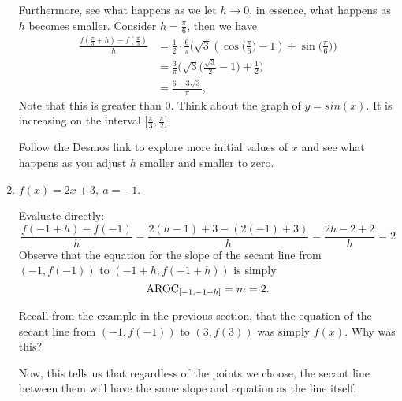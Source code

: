 \documentclass{ximera}
\begin{document}
\begin{example}
\begin{enumerate}[label=\alph*.]
\begin{explanation}
 Furthermore, see what happens as we let $h \rightarrow 0$, in essence, what happens as $h$ becomes smaller. Consider $h =\frac{\pi}{6}$, then we have 
  \begin{align*}
   \frac{f(\frac{\pi}{3} + h) - f(\frac{\pi}{3})}{h} &= \frac{1}{2} \cdot \frac{6}{\pi}\big(\sqrt{3}(\cos\Big(\frac{\pi}{6}\Big) -1) + \sin\Big(\frac{\pi}{6}\Big)\big)\\
   &= \frac{3}{\pi}\Big(\sqrt{3}\Big(\frac{\sqrt{3}}{2} -1\Big)+ \frac{1}{2}\Big)\\
   &=\frac{6-3\sqrt{3}}{\pi},
   \end{align*}
   Note that this is greater than 0. Think about the graph of $y=sin(x)$. It is increasing on the interval $\big[\frac{\pi}{3}, \frac{\pi}{2}\big]$.
   
   Follow the Desmos link to explore more initial values of $x$ and see what happens as you adjust $h$ smaller and smaller to zero.

    \end{explanation}
  
  \item $f(x) = 2x+3, \ a = -1$.\\
  \begin{explanation}
  Evaluate directly:
  \begin{equation*}
  \frac{f(-1 + h) - f(-1)}{h} = \frac{2(h-1) + 3 - (2(-1)+3)}{h} = \frac{2h-2 +2}{h} = 2 
  \end{equation*}
  Observe that the equation for the slope of the secant line from $(-1,f(-1))$ to $(-1+h,f(-1+h))$ is simply
  $$\mathrm{AROC}_{[-1,-1+h]}=  m = 2.$$
  
 Recall from the example in the previous section, that the equation of the secant line from $(-1,f(-1))$ to $(3,f(3))$ was simply $f(x)$. Why was this?
  
Now, this tells us that regardless of the points we choose, the secant line between them will have the same slope and equation as the line itself.
  \end{explanation}
   \end{enumerate}
\end{example}
\end{document}
